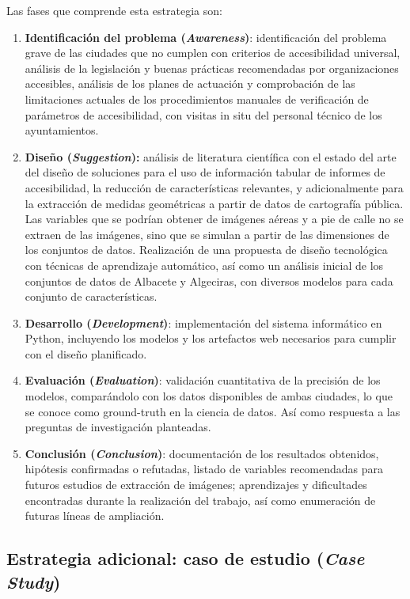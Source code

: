 Las fases que comprende esta estrategia son:
\begin{enumerate}
    \item \textbf{Identificación del problema (\textit{Awareness})}: identificación del problema grave de las ciudades que no cumplen con criterios de accesibilidad universal, análisis de la legislación y buenas prácticas recomendadas por organizaciones accesibles, análisis de los planes de actuación y comprobación de las limitaciones actuales de los procedimientos manuales de verificación de parámetros de accesibilidad, con visitas in situ del personal técnico de los ayuntamientos.
    \item \textbf{Diseño (\textit{Suggestion}):} análisis de literatura científica con el estado del arte del diseño de soluciones para el uso de información tabular de informes de accesibilidad, la reducción de características relevantes, y adicionalmente para la extracción de medidas geométricas a partir de datos de cartografía pública. Las variables que se podrían obtener de imágenes aéreas y a pie de calle no se extraen de las imágenes, sino que se simulan a partir de las dimensiones de los conjuntos de datos. Realización de una propuesta de diseño tecnológica con técnicas de aprendizaje automático, así como un análisis inicial de los conjuntos de datos de Albacete y Algeciras, con diversos modelos para cada conjunto de características.
    \item \textbf{Desarrollo (\textit{Development})}: implementación del sistema informático en Python, incluyendo los modelos y los artefactos web necesarios para cumplir con el diseño planificado.
    \item \textbf{Evaluación (\textit{Evaluation})}: validación cuantitativa de la precisión de los modelos, comparándolo con los datos disponibles de ambas ciudades, lo que se conoce como \gls{ground-truth} en la ciencia de datos. Así como respuesta a las preguntas de investigación planteadas.
    \item \textbf{Conclusión (\textit{Conclusion})}: documentación de los resultados obtenidos, hipótesis confirmadas o refutadas, listado de variables recomendadas para futuros estudios de extracción de imágenes; aprendizajes y dificultades encontradas durante la realización del trabajo, así como enumeración de futuras líneas de ampliación.
\end{enumerate}



\subsection{Estrategia adicional: caso de estudio (\textit{Case Study})}

